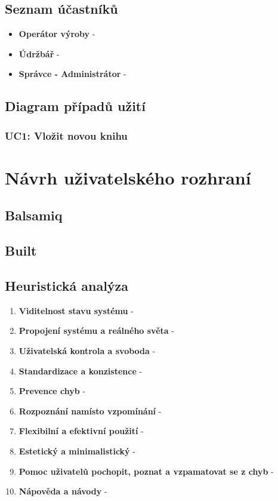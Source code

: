 \documentclass[thesis=M,czech]{FITthesis}[2012/06/26]
\begin{document}
\subsection{Seznam účastníků}

\begin{itemize}
	\item
	\textbf{Operátor výroby} - 
	\item
	\textbf{Údržbář} - 
	\item
	\textbf{Správce - Administrátor} - 
\end{itemize} 	

\subsection{Diagram případů užití}

\subsubsection{UC1: Vložit novou knihu}

\section{Návrh uživatelského rozhraní}

\subsection{Balsamiq}

\subsection{Built}

\subsection{Heuristická analýza}

\begin{enumerate}
	\item
	\textbf{Viditelnost stavu systému} -
	\item
	\textbf{Propojení systému a reálného světa} -
	\item
	\textbf{Uživatelská kontrola a svoboda} -
	\item
	\textbf{Standardizace a konzistence} -
	\item
	\textbf{Prevence chyb} -
	\item
	\textbf{Rozpoznání namísto vzpomínání} -
	\item
	\textbf{Flexibilní a efektivní použití} -
	\item
	\textbf{Estetický a minimalistický} -
	\item
	\textbf{Pomoc uživatelů pochopit, poznat a vzpamatovat se z chyb} -
	\item
	\textbf{Nápověda a návody} -
\end{enumerate} 
\end{document}
